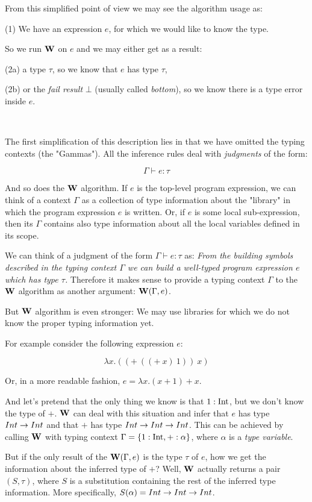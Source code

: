 \documentclass[a4paper,oneside]{memoir}
\begin{document}
From this simplified point of view we may see the algorithm usage as:

(1) We have an expression $e$, for which we would like to know the type. 

So we run $\operatorname{\textbf{W}}$ on $e$ and we may either get as a result:

(2a) a type $\tau$, so we know that $e$ has type $\tau$,

(2b) or the \textit{fail result} $\bot$ (usually called \textit{bottom}), so we know there is a type error inside $e$.

~   

The first simplification of this description lies in that we have omitted 
the typing contexts (the "Gammas"). 
All the inference rules deal with \textit{judgments} of the form:

$$\Gamma \vdash e : \tau$$

And so does the $\operatorname{\textbf{W}}$ algorithm.
If $e$ is the top-level program expression,
we can think of a context $\Gamma$ as a collection of type information about the "library"
in which the program expression $e$ is written.
Or, if $e$ is some local sub-expression, then its $\Gamma$ contains also type information about
all the local variables defined in its scope.

We can think of a judgment of the form $\Gamma \vdash e : \tau$ as: 
\textit{From the building symbols described in the typing context $\Gamma$ we can build 
a well-typed program expression $e$ which has type $\tau$.}
Therefore it makes sense to provide a typing context $\Gamma$ to the $\operatorname{\textbf{W}}$ algorithm as another argument: $\operatorname{\textbf{W}}(\Gamma, e)$.

But $\operatorname{\textbf{W}}$ algorithm is even stronger: We may use libraries for which we do not know the proper typing information yet.

For example consider the following expression $e$:

$$ \lambda x . ((+~((+~x)~1))~x) $$

Or, in a more readable fashion, $e = \lambda x . (x+1)+x $.


And let's pretend that the only thing we know is that $1 : \operatorname{Int}$, 
but we don't know the type of $+$. 
$\operatorname{\textbf{W}}$ can deal with this situation and infer that $e$ has type $Int \rightarrow Int$ and
that $+$ has type $Int \rightarrow Int \rightarrow Int$. This can be achieved by calling $\operatorname{\textbf{W}}$ with
typing context $\Gamma = \{ 1 : \operatorname{Int}, + : \alpha \}$, 
where $\alpha$ is a \textit{type variable}.

But if the only result of the $\operatorname{\textbf{W}}(\Gamma,e)$ is the type $\tau$ of $e$, 
how we get the information about the inferred type of $+$? 
Well, $\operatorname{\textbf{W}}$ actually returns a pair $(S, \tau)$, where $S$ is a substitution
containing the rest of the inferred type information. 
More specifically, $S(\alpha) = Int \rightarrow Int \rightarrow Int$.  
\end{document}
